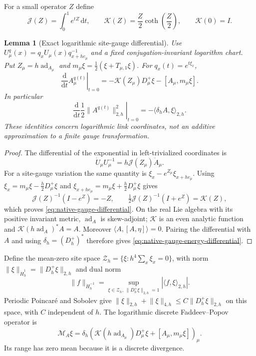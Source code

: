 \documentclass[11pt]{article}
\numberwithin{equation}{section}
\newtheorem{lemma}[lemma]{Lemma}
\theoremstyle{definition}
\theoremstyle{remark}
\newcommand{\dd}{\mathrm d}
\newcommand{\norm}[1]{\lVert#1\rVert}
\begin{document}
For a small operator $Z$ define
\begin{equation}
 \mathcal J(Z)=\int_0^1e^{tZ}\,\dd t,
 \qquad
 \mathcal K(Z)=\frac Z2\coth\!\left(\frac Z2\right),
 \qquad \mathcal K(0)=I.
 \label{eq:native-JK}
\end{equation}
\begin{lemma}[Exact logarithmic site-gauge differential]
\label{lem:native-log-gauge-differential}
Use $U^q_\mu(x)=q_xU_\mu(x)q_{x+h e_\mu}^{-1}$ and a fixed
conjugation-invariant logarithm chart. Put
$Z_\mu=h\operatorname{ad}_{A_\mu}$ and
$m_\mu\xi=\tfrac12(\xi+T_{\mu,1}\xi)$. For $q_x(t)=e^{t\xi_x}$,
\begin{equation}
 \left.\frac{\dd}{\dd t}A_\mu^{q(t)}\right|_{t=0}
 =-\mathcal K(Z_\mu)D_\mu^+\xi-[A_\mu,m_\mu\xi].
 \label{eq:native-gauge-differential}
\end{equation}
In particular
\begin{equation}
 \left.\frac{\dd}{\dd t}\frac12\norm{A^{q(t)}}_{2,h}^2\right|_{t=0}
 =-\langle\delta_hA,\xi\rangle_{2,h}.
 \label{eq:native-gauge-energy-differential}
\end{equation}
These identities concern logarithmic link coordinates, not an additive
approximation to a finite gauge transformation.
\end{lemma}
\begin{proof}
The differential of the exponential in left-trivialized coordinates is
\[
 \dot U_\mu U_\mu^{-1}
   =h\mathcal J(Z_\mu)\dot A_\mu.
\]
For a site-gauge variation the same quantity is
$\xi_x-e^{Z_\mu}\xi_{x+h e_\mu}$. Using
$\xi_x=m_\mu\xi-\tfrac h2D_\mu^+\xi$ and
$\xi_{x+h e_\mu}=m_\mu\xi+\tfrac h2D_\mu^+\xi$ gives
\[
 \mathcal J(Z)^{-1}(I-e^Z)=-Z,\qquad
 \tfrac12\mathcal J(Z)^{-1}(I+e^Z)=\mathcal K(Z),
\]
which proves \eqref{eq:native-gauge-differential}. On the real Lie algebra
with its positive invariant metric, $\operatorname{ad}_A$ is skew-adjoint;
$\mathcal K$ is an even analytic function and
$\mathcal K(h\operatorname{ad}_A)^*A=A$. Moreover
$\langle A,[A,\eta]\rangle=0$. Pairing the differential with $A$ and using
$\delta_h=(D_h^+)^*$ therefore gives
\eqref{eq:native-gauge-energy-differential}.
\end{proof}

Define the mean-zero site space
$\mathcal Z_h=\{\xi:h^4\sum_x\xi_x=0\}$, with norm
$\norm\xi_{\dot H_h^1}=\norm{D_h^+\xi}_{2,h}$ and dual norm
\[
 \norm f_{\dot H_h^{-1}}
 =\sup_{\xi\in\mathcal Z_h,\,\norm{D_h^+\xi}_{2,h}=1}
       |\langle f,\xi\rangle_{2,h}|.
\]
Periodic Poincar\'e and Sobolev give
$\norm\xi_{2,h}+\norm\xi_{4,h}\le C\norm{D_h^+\xi}_{2,h}$ on this space,
with $C$ independent of $h$. The logarithmic discrete Faddeev--Popov operator is
\begin{equation}
 \mathcal M_A\xi
 =\delta_h\left(\mathcal K(h\operatorname{ad}_{A_\mu})D_\mu^+\xi
       +[A_\mu,m_\mu\xi]\right)_\mu.
 \label{eq:native-FP}
\end{equation}
Its range has zero mean because it is a discrete divergence.
\end{document}
